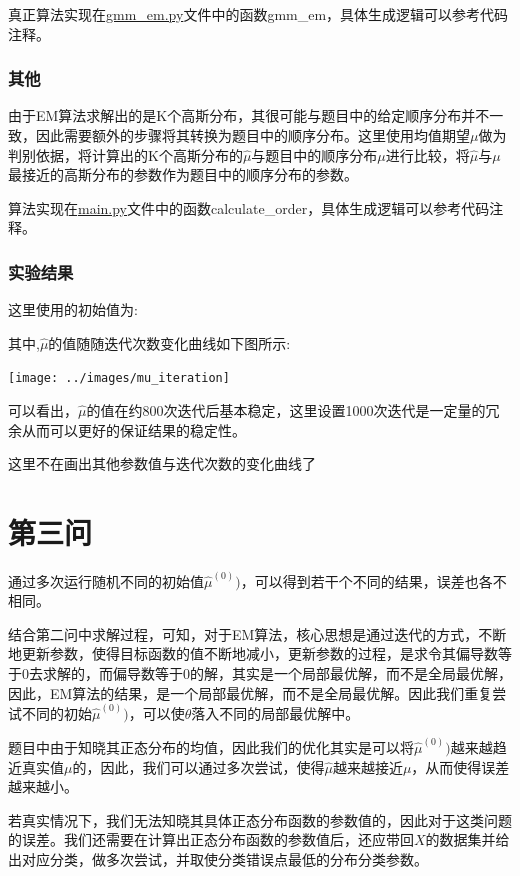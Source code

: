 \documentclass[UTF8]{article} %
\begin{document}
    真正算法实现在\href{run:gmm_em.py}{gmm\_em.py}文件中的函数gmm\_em，具体生成逻辑可以参考代码注释。

    \subsubsection{其他}
    由于EM算法求解出的是K个高斯分布，其很可能与题目中的给定顺序分布并不一致，因此需要额外的步骤将其转换为题目中的顺序分布。这里使用均值期望$\mu$做为判别依据，将计算出的K个高斯分布的$\hat{\mu}$与题目中的顺序分布$\mu$进行比较，将$\hat{\mu}$与$\mu$最接近的高斯分布的参数作为题目中的顺序分布的参数。

    算法实现在\href{run:main.py}{main.py}文件中的函数calculate\_order，具体生成逻辑可以参考代码注释。

    \subsubsection{实验结果}
    这里使用的初始值为:
    

    其中,$\hat{\mu}$的值随随迭代次数变化曲线如下图所示:

    \texttt{[image: ../images/mu\_iteration]}

    可以看出，$\hat{\mu}$的值在约800次迭代后基本稳定，这里设置1000次迭代是一定量的冗余从而可以更好的保证结果的稳定性。

    这里不在画出其他参数值与迭代次数的变化曲线了

    \section{第三问}
    通过多次运行随机不同的初始值$\hat{\mu}^{(0)})$，可以得到若干个不同的结果，误差也各不相同。

    结合第二问中求解过程，可知，对于EM算法，核心思想是通过迭代的方式，不断地更新参数，使得目标函数的值不断地减小，更新参数的过程，是求令其偏导数等于0去求解的，而偏导数等于0的解，其实是一个局部最优解，而不是全局最优解，因此，EM算法的结果，是一个局部最优解，而不是全局最优解。因此我们重复尝试不同的初始$\hat{\mu}^{(0)})$，可以使$\theta$落入不同的局部最优解中。

    题目中由于知晓其正态分布的均值，因此我们的优化其实是可以将$\hat{\mu}^{(0)})$越来越趋近真实值$\mu$的，因此，我们可以通过多次尝试，使得$\hat{\mu}$越来越接近$\mu$，从而使得误差越来越小。

    若真实情况下，我们无法知晓其具体正态分布函数的参数值的，因此对于这类问题的误差。我们还需要在计算出正态分布函数的参数值后，还应带回$X$的数据集并给出对应分类，做多次尝试，并取使分类错误点最低的分布分类参数。
\end{document}
